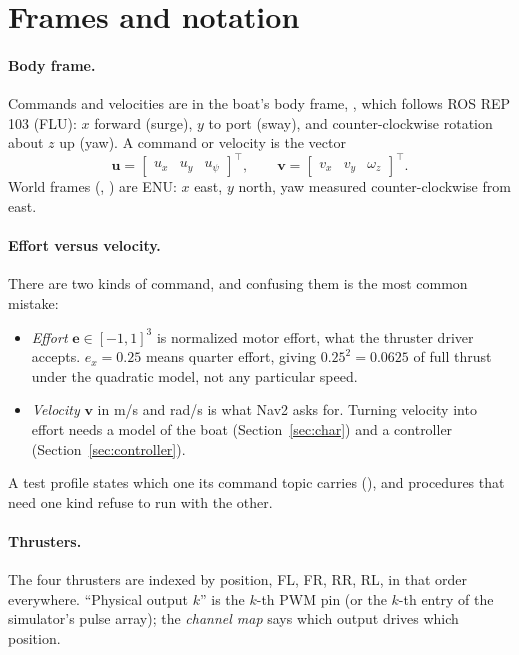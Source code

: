 \section{Frames and notation}
\label{sec:frames}

\paragraph{Body frame.} Commands and velocities are in the boat's body frame,
, which follows ROS REP 103 (FLU):
$x$ forward (surge), $y$ to port (sway), and counter-clockwise rotation about
$z$ up (yaw). A command or velocity is the vector
\[
  \bm{u} = \begin{bmatrix} u_x & u_y & u_\psi \end{bmatrix}^\top ,\qquad
  \bm{v} = \begin{bmatrix} v_x & v_y & \omega_z \end{bmatrix}^\top .
\]
World frames (, ) are ENU: $x$ east, $y$ north, yaw
measured counter-clockwise from east.

\paragraph{Effort versus velocity.} There are two kinds of command, and
confusing them is the most common mistake:
\begin{itemize}[nosep]
  \item \emph{Effort} $\bm{e}\in[-1,1]^3$ is normalized motor effort, what the
        thruster driver accepts. $e_x = 0.25$ means quarter effort, giving $0.25^2=0.0625$ of
        full thrust under the quadratic model, not any particular speed.
  \item \emph{Velocity} $\bm{v}$ in m/s and rad/s is what Nav2 asks for. Turning
        velocity into effort needs a model of the boat (Section~\ref{sec:char})
        and a controller (Section~\ref{sec:controller}).
\end{itemize}
A test profile states which one its command topic carries
(), and procedures that need one kind refuse to run with the
other.

\paragraph{Thrusters.} The four thrusters are indexed by position,
FL, FR, RR, RL, in that order everywhere. ``Physical output $k$'' is the
$k$-th PWM pin (or the $k$-th entry of the simulator's pulse array); the
\emph{channel map} says which output drives which position.
